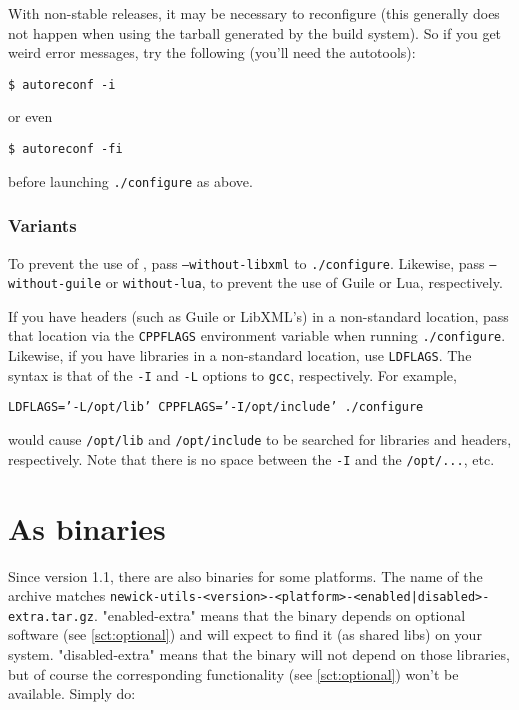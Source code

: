 With non-stable releases, it may be necessary to reconfigure (this generally
does not happen when using the tarball generated by the build system). So if you
get weird error messages, try the following (you'll need the \gnu{} autotools):

\begin{verbatim}
$ autoreconf -i
\end{verbatim}

or even

\begin{verbatim}
$ autoreconf -fi
\end{verbatim}

before launching \texttt{./configure} as above.

\subsubsection{Variants}

To prevent the use of \libxml, pass \texttt{--without-libxml} to
\texttt{./configure}. Likewise,  pass
\texttt{--without-guile} or \texttt{without-lua}, to prevent the use of Guile or
Lua, respectively. 

If you have headers (such as Guile or LibXML's) in a non-standard location, pass
that location via the \texttt{CPPFLAGS} environment variable when running
\texttt{./configure}. Likewise, if you have libraries in a non-standard
location, use \texttt{LDFLAGS}. The syntax is that of the \texttt{-I} and
\texttt{-L} options to \texttt{gcc}, respectively. For example,

\texttt{LDFLAGS='-L/opt/lib' CPPFLAGS='-I/opt/include' ./configure}

would cause \texttt{/opt/lib} and \texttt{/opt/include} to be searched for
libraries and headers, respectively. Note that there is no space between the
\texttt{-I} and the \texttt{/opt/...}, etc.

\section{As binaries}

Since version 1.1, there are also binaries for some platforms. The name of the
archive matches
\texttt{newick-utils-<version>-<platform>-<enabled|disabled>-extra.tar.gz}.
"enabled-extra" means that the binary depends on optional software (see
\ref{sct:optional})  and will expect to find it (as shared libs) on your
system. "disabled-extra" means that the binary will not depend on those
libraries, but of course the corresponding functionality (see
\ref{sct:optional}) won't be available. Simply do: 

